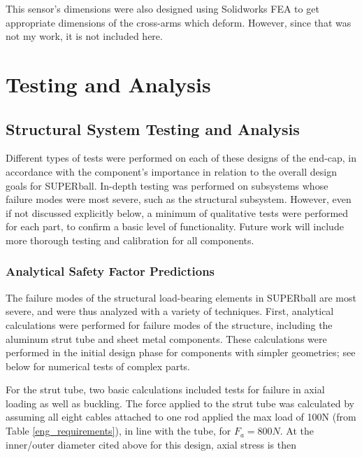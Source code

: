 \documentclass[12pt]{report}
\begin{document}
This sensor's dimensions were also designed using Solidworks FEA to get appropriate dimensions of the cross-arms which deform.
However, since that was not my work, it is not included here.



\chapter{Testing and Analysis}

\section{Structural System Testing and Analysis}\label{sec:hardware_testing}

Different types of tests were performed on each of these designs of the end-cap, in accordance with the component's importance in relation to the overall design goals for SUPERball.
In-depth testing was performed on subsystems whose failure modes were most severe, such as the structural subsystem.
However, even if not discussed explicitly below, a minimum of qualitative tests were performed for each part, to confirm a basic level of functionality.
Future work will include more thorough testing and calibration for all components.

\subsection{Analytical Safety Factor Predictions}

The failure modes of the structural load-bearing elements in SUPERball are most severe, and were thus analyzed with a variety of techniques.
First, analytical calculations were performed for failure modes of the structure, including the aluminum strut tube and sheet metal components.
These calculations were performed in the initial design phase for components with simpler geometries; see below for numerical tests of complex parts.

For the strut tube, two basic calculations included tests for failure in axial loading as well as buckling.
The force applied to the strut tube was calculated by assuming all eight cables attached to one rod applied the max load of 100N (from Table \ref{eng_requirements}), in line with the tube, for $F_a = 800N$.
At the inner/outer diameter cited above for this design, axial stress is then
\end{document}
